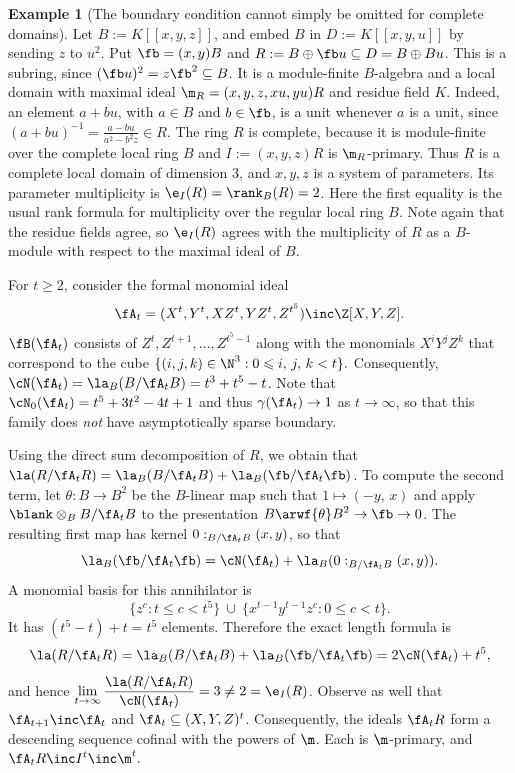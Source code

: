 \documentclass[12pt]{amsart}
\theoremstyle{plain}
\theoremstyle{remark}
\theoremstyle{definition}
\newtheorem{example}[theorem]{Example}
\numberwithin{equation}{theorem}
\renewcommand{\geq}{\geqslant} \renewcommand{\leq}{\leqslant}
\begin{document}
\begin{example}[The boundary condition cannot simply be omitted for complete domains]\label{domain}
Let $B := K[[x,y,z]]$, and embed $B$ in
$D := K[[x,y,u]]$ by sending $z$ to $u^2$. Put $\fb=(x,y)B$ and
$R := B\oplus \fb u\subseteq D = B\oplus Bu$.
This is a subring, since $(\fb u)^2=z\fb^2\subseteq B$. It is a module-finite
$B$-algebra and a local domain with maximal ideal 
$\m_R = (x,y,z,xu,yu)R$ and  residue field $K$. Indeed, 
an element $a+bu$, with $a\in B$
and $b\in \fb $, is a unit whenever $a$ is a unit, since
$\displaystyle (a+bu)^{-1}=\frac{a-bu}{a^2-b^2z}\in R$.
The ring $R$ is complete, because it is module-finite over the complete local
ring $B$ and $I:=(x,y,z)R$ is $\m_R$-primary. Thus $R$ is a
complete local domain of dimension $3$, and $x,y,z$ is a system of
parameters. Its parameter multiplicity is
$\e_I(R)=\rank_B(R)=2$. Here the first equality is the usual rank formula for multiplicity over the regular local ring $B$.  Note again that the residue fields agree, so $\e_I(R)$ agrees with the multiplicity of $R$ as a $B$-module with respect to the maximal ideal of $B$.


For $t \geq 2$, consider the formal monomial ideal
\[
 \fA_t=(X^t,Y^t,XZ^t,YZ^t,Z^{t^5})
 \inc\Z[X,Y,Z].
\]
$\fB(\fA_t)$ consists of $Z^t,Z^{t+1},\ldots,Z^{t^5-1}$ along
with the monomials $X^iY^jZ^k$ that correspond to the cube
$\{(i,j,k) \in \N^3: 0\leq i,\, j,\, k < t\}.$ 
 Consequently, $\cN(\fA_t)=\la_B(B/\fA_t B) = t^3+t^5-t$.  
 Note that $\cN_0(\fA_t) = t^5+3t^2-4t+1$ and thus 
 $\gamma(\fA_t)\to 1$ as $t \to \infty$, so that this family does \textit{not} 
have asymptotically sparse boundary.  

Using the direct sum decomposition of $R$, we obtain that 
$\la(R/\fA_tR)
   =\la_B(B/\fA_t B)+\la_B(\fb /\fA_t \fb )$.
To compute the second term, let $\theta: B \to B^2$  be the
$B$-linear map such that $1 \mapsto (-y,\, x)$ and apply $\blank \otimes_B B/\fA_t B$ 
to the presentation $\displaystyle B\arwf{\theta}B^2 \to \fb \to 0$.
The resulting first map has kernel
$0:_{B/\fA_tB}(x,y)$, so that 
\[
 \la_B(\fb /\fA_t \fb )
   =\cN(\fA_t)+\la_B(0:_{B/\fA_tB}(x,y)).
\]
A monomial basis for this annihilator is
\[
 \{z^c:t \leq c < t^5\}
 \ \cup\
 \{x^{t-1}y^{t-1}z^c : 0\leq c < t\}.
\]
It has $(t^5 - t) + t = t^5$ elements. Therefore the exact length formula is
\[
 \la(R/\fA_tR)  = \la_B(B/\fA_tB) + \la_B(\fb/\fA_t\fb)= 2\cN(\fA_t) + t^5,
\]
and hence 
$\displaystyle \lim_{t\to\infty} \frac{\la(R/\fA_tR)}{\cN(\fA_t)}  =3
 \neq 2 = \e_I(R)$. Observe as well that $\fA_{t+1}\inc\fA_t$ \linebreak \vspace*{3pt}
and $\fA_t\subseteq(X,Y,Z)^t$.  Consequently, the ideals $\fA_t R$ form a 
descending sequence cofinal with the powers of  $\m$.  
Each is $\m$-primary, and $\fA_t R \inc I^t \inc \m^t.$
\end{example}
\end{document}
